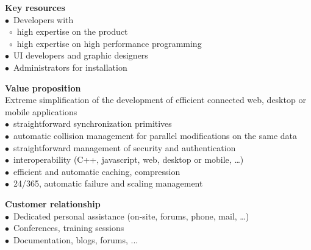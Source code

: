 \documentclass[a4paper,10pt]{scrreprt}
\begin{document}
\begin{sideways}
\begin{small}
\begin{minipage}{\textheight}
\begin{minipage}[t]{0.19\textheight}
        \begin{minipage}[t]{\textwidth}
        \begin{flushleft}
            \textbf{\color{MSBlue}\large Key resources}\\
            $\bullet$~Developers with\\
            ~$\circ$~high expertise on the product\\
            ~$\circ$~high expertise on high performance programming\\
            $\bullet$~UI developers and graphic designers\\
            $\bullet$~Administrators for installation
        \end{flushleft}
        \end{minipage}
    \end{minipage}
    \hfill
    \begin{minipage}[t]{0.19\textheight}
    \begin{flushleft}
        \textbf{\color{MSBlue}\large Value proposition}\\
        Extreme simplification of the development of efficient connected web, desktop or mobile applications\\
        $\bullet$~straightforward synchronization primitives\\
        $\bullet$~automatic collision management for parallel modifications on the same data\\
        $\bullet$~straightforward management of security and authentication\\
        $\bullet$~interoperability (C++, javascript, web, desktop or mobile, \dots)\\
        $\bullet$~efficient and automatic caching, compression\\
        $\bullet$~24/365, automatic failure and scaling management
    \end{flushleft}
    \end{minipage}
    \hfill
    \begin{minipage}[t]{0.19\textheight}
        \begin{minipage}[t]{\textwidth}
        \begin{flushleft}
            \textbf{\color{MSBlue}\large Customer relationship}\\
            $\bullet$~Dedicated personal assistance (on-site, forums, phone, mail, …)\\
            $\bullet$~Conferences, training sessions\\
            $\bullet$~Documentation, blogs, forums, ...
        \end{flushleft}
        \end{minipage}
        

\end{minipage}
\end{minipage}
\end{small}
\end{sideways}
\end{document}
